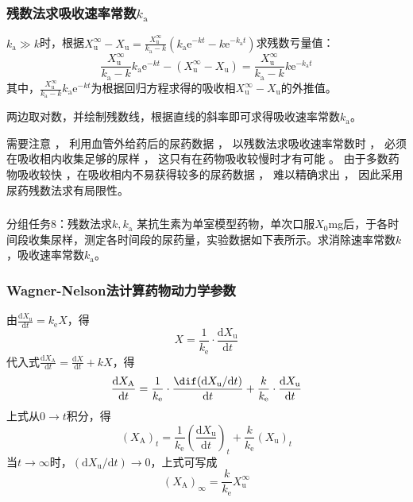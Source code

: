 \documentclass[dvipsnames, svgnames, x11names]{beamer}
\begin{document}
\begin{frame}
    \frametitle{残数法求吸收速率常数$k_\mathrm{a}$}
    $k_\mathrm{a}\gg k$时，根据$X_\mathrm{u}^\infty - X_\mathrm{u} = \frac{X_\mathrm{u}^\infty}{k_\mathrm{a} - k}(k_\mathrm{a}\mathrm{e}^{-kt} - k\mathrm{e}^{-k_\mathrm{a}t})$求残数亏量值：
    \[
        \frac{X_\mathrm{u}^\infty}{k_\mathrm{a} - k} k_\mathrm{a}\mathrm{e}^{-kt} - (X_\mathrm{u}^\infty - X_\mathrm{u}) = \frac{X_\mathrm{u}^\infty}{k_\mathrm{a} - k} k\mathrm{e}^{-k_\mathrm{a}t}
    \]
    其中，$\frac{X_\mathrm{u}^\infty}{k_\mathrm{a} - k} k_\mathrm{a}\mathrm{e}^{-kt}$为根据回归方程求得的吸收相$X_\mathrm{u}^\infty - X_\mathrm{u}$的外推值。

    两边取对数，并绘制残数线，根据直线的斜率即可求得吸收速率常数$k_\mathrm{a}$。
    \begin{alertblock}
        需要注意 ， 利用血管外给药后的尿药数据 ， 以残数法求吸收速率常数时 ， 必须在吸收相内收集足够的尿样 ， 这只有在药物吸收较慢时才有可能 。 由于多数药物吸收较快 ，在吸收相内不易获得较多的尿药数据 ， 难以精确求出 ， 因此采用尿药残数法求有局限性。
    \end{alertblock}
\end{frame}


\begin{frame}[t]
    \frametitle{}
    \begin{redblock}{分组任务8：残数法求$k, k_\mathrm{a}$}
        某抗生素为单室模型药物，单次口服$X_0$mg后，于各时间段收集尿样，测定各时间段的尿药量，实验数据如下表所示。求消除速率常数$k$，吸收速率常数$k_\mathrm{a}$。
    \end{redblock}
\end{frame}


\begin{frame}
    \frametitle{Wagner-Nelson法计算药物动力学参数}
    由$\frac{\mathrm{d}X_\mathrm{u}}{\mathrm{d}t}=k_\mathrm{e}X$，得
    \[
        X = \frac{1}{k_\mathrm{e}} \cdot \frac{\mathrm{d}X_\mathrm{u}}{\mathrm{d}t}
    \]
    代入式$\frac{\mathrm{d}X_\mathrm{A}}{\mathrm{d}t} = \frac{\mathrm{d}X}{\mathrm{d}t} + kX$，得
    \[
        \frac{\mathrm{d}X_\mathrm{A}}{\mathrm{d}t} = \frac{1}{k_\mathrm{e}} \cdot \frac{\dif (\mathrm{d}X_\mathrm{u}/\mathrm{d}t)}{\mathrm{d}t} + \frac{k}{k_\mathrm{e}} \cdot \frac{\mathrm{d}X_\mathrm{u}}{\mathrm{d}t}
    \]
    上式从$0 \to t$积分，得
    \[
        (X_\mathrm{A})_t = \frac{1}{k_\mathrm{e}} \left(\frac{\mathrm{d}X_\mathrm{u}}{\mathrm{d}t}\right)_t + \frac{k}{k_\mathrm{e}}(X_\mathrm{u})_t
    \]
    当$t \to \infty$时，$(\mathrm{d}X_\mathrm{u}/\mathrm{d}t) \to 0$，上式可写成
    \[
        (X_\mathrm{A})_\infty = \frac{k}{k_\mathrm{e}}X_\mathrm{u}^\infty
    \]
\end{frame}
\end{document}

